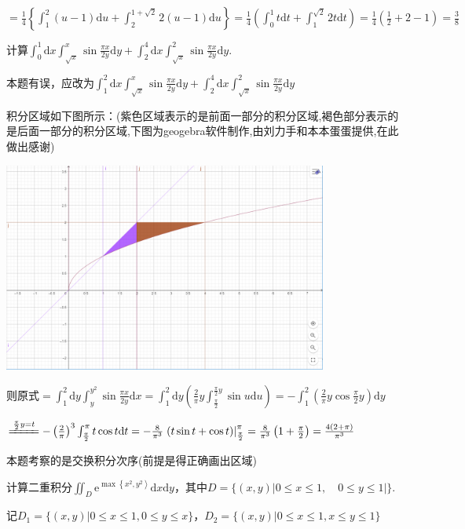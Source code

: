 \begin{xiti}
\begin{solution}
		$=\frac{1}{4}\left\{\int_{1}^{2}(u-1) \mathrm{d} u+\int_{2}^{1+\sqrt{2}} 2(u-1) \mathrm{d} u\right\}=\frac{1}{4}\left(\int_{0}^{1} t \mathrm{d} t+\int_{1}^{\sqrt{2}} 2 t \mathrm{d} t\right)=\frac{1}{4}\left(\frac{1}{2}+2-1\right)=\frac{3}{8}$
	\end{solution}
	\item 计算$\int_{0}^{1} \mathrm{d} x \int_{\sqrt{x}}^{x} \sin \frac{\pi x}{2 y} \mathrm{d} y+\int_{2}^{4} \mathrm{d} x \int_{\sqrt{x}}^{2} \sin \frac{\pi x}{2 y} \mathrm{d} y$.
	\begin{note}
		本题有误，应改为$\int_{1}^{2} \mathrm{d} x \int_{\sqrt{x}}^{x} \sin \frac{\pi x}{2 y} \mathrm{d} y+\int_{2}^{4} \mathrm{d} x \int_{\sqrt{x}}^{2} \sin \frac{\pi x}{2 y} \mathrm{d} y$	
	\end{note}
	\begin{solution}
		积分区域如下图所示：(紫色区域表示的是前面一部分的积分区域,褐色部分表示的是后面一部分的积分区域,下图为geogebra软件制作,由刘力手和本本蛋蛋提供,在此做出感谢)
		
		\includegraphics[width=0.80\textwidth]{Problem_3.png}
	
		则原式$=\int_{1}^{2} \mathrm{d} y \int_{y}^{y^{2}} \sin \frac{\pi x}{2 y} \mathrm{d} x=\int_{1}^{2} \mathrm{d} y\left(\frac{2}{\pi} y \int_{\frac{\pi}{2}}^{\frac{\pi}{2} y} \sin u \mathrm{d} u\right)=-\int_{1}^{2}\left(\frac{2}{\pi} y \cos \frac{\pi}{2} y\right) \mathrm{d} y$
		
		$\xlongequal{\frac{\pi}{2}y = t }-\left(\frac{2}{\pi}\right)^{3} \int_{\frac{\pi}{2}}^{\pi} t \cos t \mathrm{d} t=-\frac{8}{\pi^{3}}\left.(t \sin t+\cos t)\right|_{\frac{\pi}{2}} ^{\pi}=\frac{8}{\pi^{3}}\left(1+\frac{\pi}{2}\right)=\frac{4(2+\pi)}{\pi^{3}}$
		
		\begin{note}
			本题考察的是交换积分次序(前提是得正确画出区域)
		\end{note}
	\end{solution}
	\item 计算二重积分$\iint_{D} \mathrm{e}^{\max \left\{x^{2}, y^{2}\right\rangle} \mathrm{d} x \mathrm{d} y$，其中$D=\{(x, y)|0 \leqslant x \leqslant 1, \quad 0 \leqslant y \leqslant 1|\}$.
	\begin{solution}
		记$D_{1}=\{(x, y) | 0 \leq x \leq 1,0 \leq y \leq x\}$，$D_{2}=\{(x, y) | 0 \leq x \leq 1, x \leq y \leq 1\}$
		

\end{solution}
\end{xiti}
